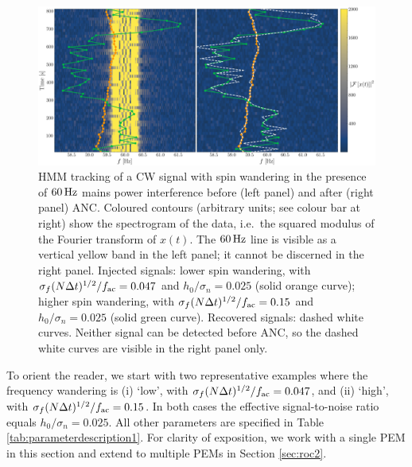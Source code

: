 \documentclass[pra,superscriptaddress,reprint,amsmath,amssymb,nofootinbib]{revtex4-2}
\begin{document}
\begin{figure}
	\begin{center}
			\includegraphics[width=\textwidth]{images/viterbi_tracking_canonical}
		\end{center}
	\caption{\label{frequency tracking before and after1}
			HMM tracking of a CW signal with spin wandering in the presence of $60 \, {\rm Hz}$ mains power interference before (left panel) and after (right panel) ANC. Coloured contours (arbitrary units; see colour bar at right) show the spectrogram of the data, i.e.\ the squared modulus of the Fourier transform of $x(t)$. The $60 \, {\rm Hz}$ line is visible as a vertical yellow band in the left panel; it cannot be discerned in the right panel. Injected signals: lower spin wandering, with $\sigma_f (N \Delta t)^{1/2} / f_{\rm ac} = 0.047$ and $h_0 / \sigma_n = 0.025$ (solid orange curve); higher spin wandering, with $\sigma_f (N \Delta t)^{1/2} / f_{\rm ac} = 0.15$ and $h_0 / \sigma_n = 0.025$  (solid green curve). Recovered signals: dashed white curves. Neither signal can be detected before ANC, so the dashed white curves are visible in the right panel only.}
\end{figure}
To orient the reader, we start with two representative examples where the frequency wandering is  (i) `low', with $\sigma_f (N \Delta t)^{1/2} / f_{\rm ac} = 0.047$, and (ii) `high', with $\sigma_f (N \Delta t)^{1/2} / f_{\rm ac} = 0.15$. In both cases the effective signal-to-noise ratio equals $h_0 / \sigma_n = 0.025$. All other parameters are specified in Table \ref{tab:parameterdescription1}. For clarity of exposition, we work with a single PEM in this section and extend to multiple PEMs in Section \ref{sec:roc2}. \newline 
\end{document}
